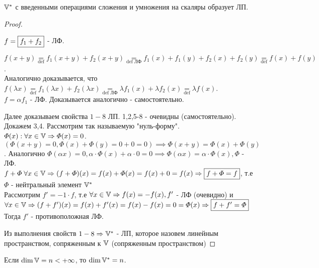\documentclass[../main.tex]{subfiles}
\begin{document}
\begin{theorem}
    $\mathbb{V}^{*}$ с введенными операциями сложения и умножения на скаляры образует ЛП. 
\end{theorem}
\begin{proof}
\begin{lemma}
    $f =  \fbox{$f_{1} + f_{2}$}$ - ЛФ. 
\end{lemma}

    $f(x+y) \underset{\text{def}}{=} f_{1}(x+y)+f_{2}(x+y) \underset{\text{def ЛФ}}{=} f_{1}(x)+f_{1}(y)+f_{2}(x)+f_{2}(y) \underset{\text{def}}{=} f(x)+f(y)$.
    \\Аналогично доказывается, что $f(\lambda x ) \underset{\text{def}}{=} f_{1}(\lambda x)+f_{2}(\lambda x) \underset{\text{def ЛФ}}{=} \lambda f_{1}(x)+\lambda f_{2}(x) \underset{\text{def}}{=} \lambda f(x)$.
    \\$f= \alpha f_{1} $ - ЛФ. Доказывается аналогично - самостоятельно.

Далее доказываем свойства $1-8$ ЛП. 1,2,5-8 - очевидны (самостоятельно).
Докажем 3,4. Рассмотрим так называемую "нуль-форму". $\varPhi(x): \forall x \in\mathbb{V} \Rightarrow \varPhi (x) = 0$. $(\varPhi(x+y)=0, \varPhi(x) +\varPhi(y) = 0+ 0 = 0 )\implies \varPhi(x+y)=\varPhi(x)+\varPhi(y)$. Аналогично $\varPhi(\alpha x)=0, \alpha \cdot \varPhi(x)+\alpha \cdot 0=0 \implies \varPhi(\alpha x) = \alpha\cdot \varPhi(x), \varPhi$ - ЛФ. 
\\$f+\varPhi \; \forall x\in \mathbb{V} \Rightarrow (f+\varPhi)(x) = f(x)+\varPhi(x) = f(x)+0 = f(x) \Rightarrow \fbox{$f+\varPhi = f$}$, т.е $\varPhi$ - нейтральный элемент $\mathbb{V}^{*}$
\\Рассмотрим $f'=-1\cdot f$,  т.е $\forall x \in\mathbb{V} \Rightarrow f(x)=-f(x), f'$ - ЛФ (очевидно) и $\forall x \in \mathbb{V} \Rightarrow (f+f')(x) = f(x)+f'(x) = f(x)-f(x) = 0 = \varPhi(x)\Rightarrow \fbox{$f+ f' = \varPhi$}$\; Тогда $f'$ - противоположная ЛФ. 

Из выполнения свойств $1-8\Rightarrow \mathbb{V}^{*}$ - ЛП, которое назовем линейным пространством, сопряженным к $\mathbb{V}$ (сопряженным пространством)
\end{proof}
\begin{theorem} 
    Если $\dim \mathbb{V} = n< +\infty$, то $\dim \mathbb{V}^{*} = n$. 
\end{theorem}
\end{document}
